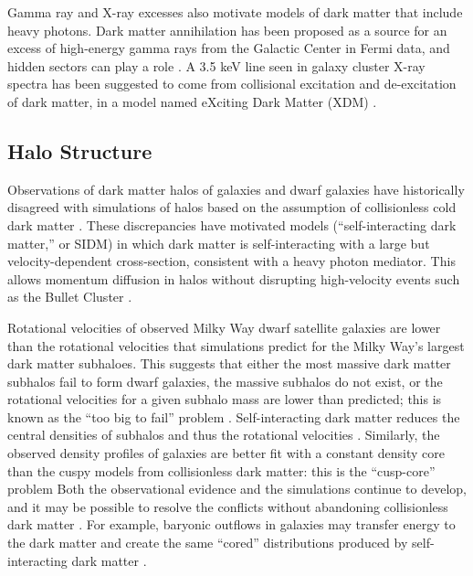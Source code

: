 Gamma ray and X-ray excesses also motivate models of dark matter that include heavy photons.
Dark matter annihilation has been proposed as a source for an excess of high-energy gamma rays from the Galactic Center in Fermi data, and hidden sectors can play a role \cite{hooper_dark_2011}.
A 3.5 keV line seen in galaxy cluster X-ray spectra \cite{bulbul_detection_2014,boyarsky_unidentified_2014} has been suggested to come from collisional excitation and de-excitation of dark matter, in a model named eXciting Dark Matter (XDM) \cite{finkbeiner_x-ray_2014}.

\subsection{Halo Structure}
Observations of dark matter halos of galaxies and dwarf galaxies have historically disagreed with simulations of halos based on the assumption of collisionless cold dark matter \cite{weinberg_cold_2013}.
These discrepancies have motivated models (``self-interacting dark matter,'' or SIDM) in which dark matter is self-interacting with a large but velocity-dependent cross-section, consistent with a heavy photon mediator.
This allows momentum diffusion in halos without disrupting high-velocity events such as the Bullet Cluster \cite{spergel_observational_2000,tulin_beyond_2013}.

Rotational velocities of observed Milky Way dwarf satellite galaxies are lower than the rotational velocities that simulations predict for the Milky Way's largest dark matter subhaloes.
This suggests that either the most massive dark matter subhalos fail to form dwarf galaxies, the massive subhalos do not exist, or the rotational velocities for a given subhalo mass are lower than predicted; this is known as the ``too big to fail'' problem \cite{boylan-kolchin_too_2011}.
Self-interacting dark matter reduces the central densities of subhalos and thus the rotational velocities \cite{vogelsberger_subhaloes_2012}.
Similarly, the observed density profiles of galaxies are better fit with a constant density core than the cuspy models from collisionless dark matter: this is the ``cusp-core'' problem \cite{de_naray_baryons_2011}
Both the observational evidence and the simulations continue to develop, and it may be possible to resolve the conflicts without abandoning collisionless dark matter \cite{oman_unexpected_2015}.
For example, baryonic outflows in galaxies may transfer energy to the dark matter and create the same ``cored'' distributions produced by self-interacting dark matter \cite{governato_cuspy_2012}.

